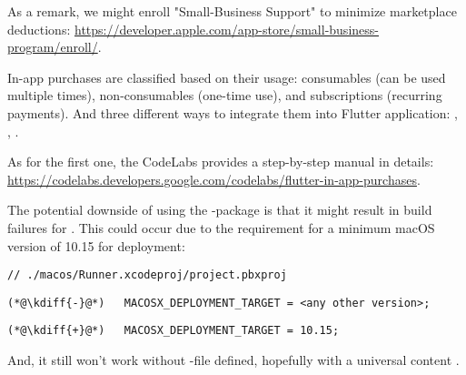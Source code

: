 \noindent As a remark, we might enroll "Small-Business Support" to minimize marketplace deductions:
\href{https://developer.apple.com/app-store/small-business-program/enroll/}{https://developer.apple.com/app-store/small-business-program/enroll/}.

In-app purchases are classified based on their usage: consumables (can be used multiple times), non-consumables 
(one-time use), and subscriptions (recurring payments). And three different ways to integrate them into Flutter 
application: , , . 

As for the first one, the CodeLabs provides a step-by-step manual in details:
\href{https://codelabs.developers.google.com/codelabs/flutter-in-app-purchases}{https://codelabs.developers.google.com/codelabs/flutter-in-app-purchases}.


\noindent The potential downside of using the -package is that it might result in build failures 
for . This could occur due to the requirement for a minimum macOS version of 10.15 for deployment:

\begin{lstlisting}
// ./macos/Runner.xcodeproj/project.pbxproj
\end{lstlisting}
{
\xpretocmd{\lstlisting}{\vspace{-12pt}}{}{}
\begin{lstlisting}[firstnumber=2, backgroundcolor=\color{backred}]
(*@\kdiff{-}@*)   MACOSX_DEPLOYMENT_TARGET = <any other version>;
\end{lstlisting}
\begin{lstlisting}[firstnumber=2, backgroundcolor=\color{backgreen}]
(*@\kdiff{+}@*)   MACOSX_DEPLOYMENT_TARGET = 10.15;
\end{lstlisting}
}

\noindent And, it still won't work without -file defined, hopefully with a universal content 
.